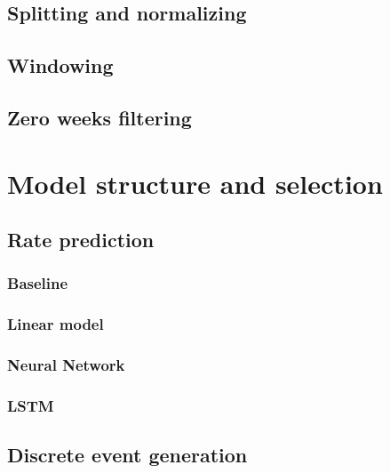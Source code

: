 \documentclass[10pt,conference,compsocconf]{IEEEtran}
\begin{document}
\subsection{Splitting and normalizing}

\subsection{Windowing}

\subsection{Zero weeks filtering}



\section{Model structure and selection}

\subsection{Rate prediction}

\subsubsection{Baseline}

\subsubsection{Linear model}

\subsubsection{Neural Network}

\subsubsection{LSTM}

\subsection{Discrete event generation}


\end{document}
